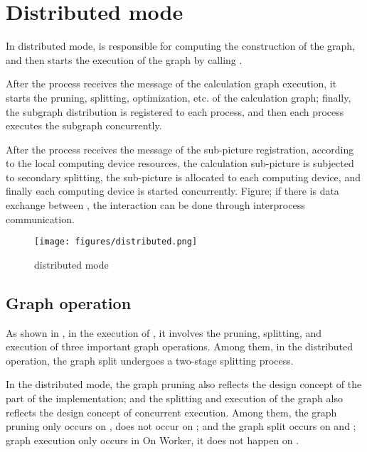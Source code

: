 \section{Distributed mode}
\begin{content}
In distributed mode,  is responsible for computing the construction of the graph, and then starts the execution of the graph by calling .

After the  process receives the message of the calculation graph execution, it starts the pruning, splitting, optimization, etc. of the calculation graph; finally, the subgraph distribution is registered to each  process, and then each  process executes the subgraph concurrently.

After the  process receives the message of the sub-picture registration, according to the local computing device resources, the calculation sub-picture is subjected to secondary splitting, the sub-picture is allocated to each computing device, and finally each computing device is started concurrently. Figure; if there is data exchange between , the interaction can be done through interprocess communication.

\begin{figure}[H]
  \centering
  \texttt{[image: figures/distributed.png]}
  \caption{distributed mode}
  \label{fig:distributed}
\end{figure}


\subsection{Graph operation}
As shown in , in the execution of , it involves the pruning, splitting, and execution of three important graph operations. Among them, in the distributed operation, the graph split undergoes a two-stage splitting process.

\begin{enum}
\end{enum}

In the distributed mode, the graph pruning also reflects the design concept of the \tf{} part of the implementation; and the splitting and execution of the graph also reflects the design concept of \tf{} concurrent execution. Among them, the graph pruning only occurs on , does not occur on ; and the graph split occurs on  and ; graph execution only occurs in \ascii On {Worker}, it does not happen on .


\end{content}

